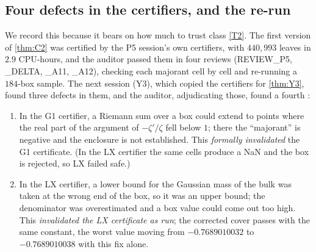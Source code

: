 \documentclass[11pt]{article}
\theoremstyle{definition}
\begin{document}
\subsection{Four defects in the certifiers, and the re-run}\label{sec:defects}

We record this because it bears on how much to trust class \ref{T2}. The first version of \cref{thm:C2} was certified by the P5 session's own certifiers, with $440{,}993$ leaves in $2.9$ CPU-hours, and the auditor passed them in four reviews (REVIEW\_P5, \_DELTA, \_A11, \_A12), checking each majorant cell by cell and re-running a $184$-box sample. The next session (Y3), which copied the certifiers for \cref{thm:Y3}, found three defects in them, and the auditor, adjudicating those, found a fourth \cite[Y3 memo \S4; REVIEW\_Y3]{dq1records}:
\begin{enumerate}[label=B\arabic*.]
\item In the G1 certifier, a Riemann sum over a box could extend to points where the real part of the argument of $-\zeta'/\zeta$ fell below $1$; there the ``majorant'' is negative and the enclosure is not established. This \emph{formally invalidated} the G1 certificate. (In the LX certifier the same cells produce a NaN and the box is rejected, so LX failed safe.)
\item In the LX certifier, a lower bound for the Gaussian mass of the bulk was taken at the wrong end of the box, so it was an upper bound; the denominator was overestimated and a box value could come out too high. This \emph{invalidated the LX certificate as run}; the corrected cover passes with the same constant, the worst value moving from $-0.7689010032$ to $-0.7689010038$ with this fix alone.

\end{enumerate}
\end{document}
